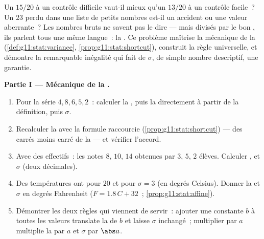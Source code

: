 \begin{problem}
\label{pb:g11:stat:1}
Un $15/20$ à un contrôle difficile vaut-il mieux qu'un $13/20$ à un
contrôle facile~? Un $23$ perdu dans une liste de petits nombres
est-il un accident ou une valeur aberrante~? Les nombres bruts ne
savent pas le dire --- mais divisés par le bon , ils
parlent tous une même langue~: la \emph{}. Ce problème
maîtrise la mécanique de la 
(\cref{def:g11:stat:variance}, \cref{prop:g11:stat:shortcut}),
construit la règle universelle, et démontre la remarquable inégalité
qui fait de $\sigma$, de simple nombre descriptif, une garantie.

\medskip
\noindent\textbf{Partie I --- Mécanique de la .}
\begin{enumerate}
  \item Pour la série $4, 8, 6, 5, 2$~: calculer la , puis la
         directement à partir de la définition, puis
        $\sigma$.
  \item Recalculer la  avec la formule raccourcie
        (\cref{prop:g11:stat:shortcut}) ---  des carrés moins
        carré de la  --- et vérifier l'accord.
  \item Avec des effectifs~: les notes $8$, $10$, $14$ obtenues par
        $3$, $5$, $2$ élèves. Calculer ,  et $\sigma$
        (deux décimales).
  \item Des températures ont pour  $20$ et pour 
        $\sigma = 3$ (en degrés Celsius). Donner la  et
        $\sigma$ en degrés Fahrenheit ($F = 1.8\,C + 32$~;
        \cref{prop:g11:stat:affine}).
  \item Démontrer les deux règles qui viennent de servir~: ajouter
        une constante $b$ à toutes les valeurs translate la 
        de $b$ et laisse $\sigma$ inchangé~; multiplier par $a$
        multiplie la  par $a$ et $\sigma$ par $\abs a$.
\end{enumerate}


\end{problem}
